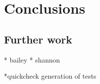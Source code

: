 \chapter{Conclusions}\label{ch:conclusions}
\section{Further work}\label{sec:furtherwork}
* bailey
* shannon

*quickcheck generation of tests

